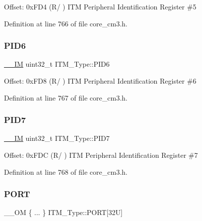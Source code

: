 Offset\+: 0x\+F\+D4 (R/ ) I\+TM Peripheral Identification Register \#5 

Definition at line 766 of file core\+\_\+cm3.\+h.

\mbox{\label{struct_i_t_m___type_ad34dbe6b1072c77d36281049c8b169f6}} 
\subsubsection{\texorpdfstring{P\+I\+D6}{PID6}}
{\footnotesize\ttfamily \hyperlink{core__sc300_8h_a4cc1649793116d7c2d8afce7a4ffce43}{\+\_\+\+\_\+\+IM} uint32\+\_\+t I\+T\+M\+\_\+\+Type\+::\+P\+I\+D6}

Offset\+: 0x\+F\+D8 (R/ ) I\+TM Peripheral Identification Register \#6 

Definition at line 767 of file core\+\_\+cm3.\+h.

\mbox{\label{struct_i_t_m___type_a2bcec6803f28f30d5baf5e20e3517d3d}} 
\subsubsection{\texorpdfstring{P\+I\+D7}{PID7}}
{\footnotesize\ttfamily \hyperlink{core__sc300_8h_a4cc1649793116d7c2d8afce7a4ffce43}{\+\_\+\+\_\+\+IM} uint32\+\_\+t I\+T\+M\+\_\+\+Type\+::\+P\+I\+D7}

Offset\+: 0x\+F\+DC (R/ ) I\+TM Peripheral Identification Register \#7 

Definition at line 768 of file core\+\_\+cm3.\+h.

\mbox{\label{struct_i_t_m___type_a1f61b04815065bea9ae1d2c4435fcd94}} 
\subsubsection{\texorpdfstring{P\+O\+RT}{PORT}\hspace{0.1cm}{\footnotesize\ttfamily [1/4]}}
{\footnotesize\ttfamily \+\_\+\+\_\+\+OM \{ ... \}    I\+T\+M\+\_\+\+Type\+::\+P\+O\+RT\mbox{[}32\+U\mbox{]}}

